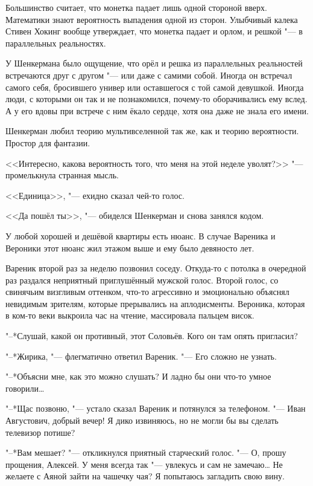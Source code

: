 Большинство считает, что монетка падает лишь одной стороной вверх.
Математики знают вероятность выпадения одной из сторон.
Улыбчивый калека Стивен Хокинг вообще утверждает, что монетка падает и орлом, и решкой "--- в параллельных реальностях.

У Шенкермана было ощущение, что орёл и решка из параллельных реальностей встречаются друг с другом "--- или даже с самими собой.
Иногда он встречал самого себя, бросившего универ или оставшегося с той самой девушкой.
Иногда люди, с которыми он так и не познакомился, почему-то оборачивались ему вслед.
А у его вдовы при встрече с ним ёкало сердце, хотя она даже не знала его имени.

Шенкерман любил теорию мультивселенной так же, как и теорию вероятности.
Простор для фантазии.

<<Интересно, какова вероятность того, что меня на этой неделе уволят?>> "--- промелькнула странная мысль.

<<Единица>>, "--- ехидно сказал чей-то голос.

<<Да пошёл ты>>, "--- обиделся Шенкерман и снова занялся кодом.

\asterism

У любой хорошей и дешёвой квартиры есть нюанс.
В случае Вареника и Вероники этот нюанс жил этажом выше и ему было девяносто лет.

Вареник второй раз за неделю позвонил соседу.
Откуда-то с потолка в очередной раз раздался неприятный приглушённый мужской голос.
Второй голос, со свинячьим визгливым оттенком, что-то агрессивно и эмоционально объяснял невидимым зрителям, которые прерывались на аплодисменты.
Вероника, которая в ком-то веки выкроила час на чтение, массировала пальцем висок.

"--*Слушай, какой он противный, этот Соловьёв.
Кого он там опять пригласил?

"--*Жирика, "--- флегматично ответил Вареник.
"--- Его сложно не узнать.

"--*Объясни мне, как это можно слушать?
И ладно бы они что-то умное говорили\ldots{}

"--*Щас позвоню, "--- устало сказал Вареник и потянулся за телефоном.
"--- Иван Августович, добрый вечер!
Я дико извиняюсь, но не могли бы вы сделать телевизор потише?

"--*Вам мешает? "--- откликнулся приятный старческий голос.
"--- О, прошу прощения, Алексей.
У меня всегда так "--- увлекусь и сам не замечаю\ldots{}
Не желаете с Аяной зайти на чашечку чая?
Я попытаюсь загладить свою вину.

